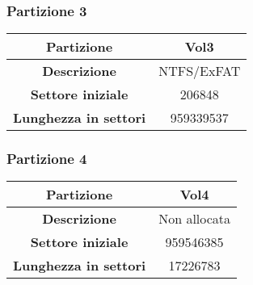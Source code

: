 \vspace{3pt}
\subsubsection{Partizione 3}
\begin{center}
    \renewcommand{\arraystretch}{1.5}
    \begin{tabular}{|c|c|}
        \hline
        \textbf{Partizione} & Vol3 \\
        \hline
        \textbf{Descrizione} & NTFS/ExFAT \\
        \hline
        \textbf{Settore iniziale} & 206848 \\
        \hline
        \textbf{Lunghezza in settori} & 959339537 \\
        \hline
    \end{tabular}
\end{center}

\vspace{3pt}
\subsubsection{Partizione 4}
\begin{center}
    \renewcommand{\arraystretch}{1.5}
    \begin{tabular}{|c|c|}
        \hline
        \textbf{Partizione} & Vol4 \\
        \hline
        \textbf{Descrizione} & Non allocata \\
        \hline
        \textbf{Settore iniziale} & 959546385 \\
        \hline
        \textbf{Lunghezza in settori} & 17226783 \\
        \hline
    \end{tabular}
\end{center}

